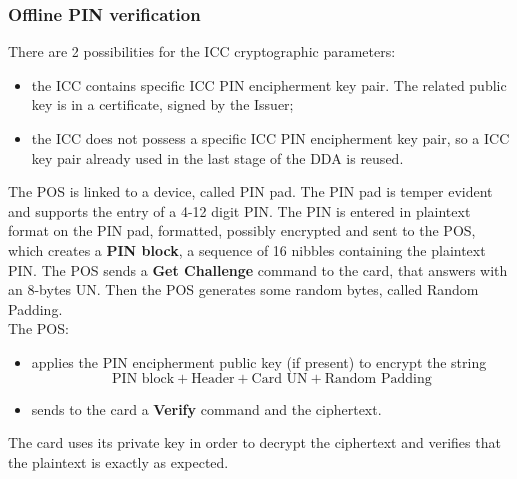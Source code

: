 \documentclass[a4paper, 10pt, titlepage]{article}
\begin{document}
\subsubsection*{Offline PIN verification}
There are 2 possibilities for the ICC cryptographic parameters:
\begin{itemize}
\item the ICC contains specific ICC PIN encipherment key pair. The related public key is in a certificate, signed by the Issuer;
\item the ICC does not possess a specific ICC PIN encipherment key pair, so a ICC key pair already used in the last stage of the DDA is reused.
\end{itemize}
The POS is linked to a device, called PIN pad. The PIN pad is temper evident and supports the entry of a 4-12 digit PIN. The PIN is entered in plaintext format on the PIN pad, formatted, possibly encrypted and sent to the POS, which creates a \textbf{PIN block}, a sequence of 16 nibbles containing the plaintext PIN.
The POS sends a \textbf{Get Challenge} command to the card, that answers with an 8-bytes UN. Then the POS generates some random bytes, called Random Padding. \\
The POS:
\begin{itemize}
\item applies the PIN encipherment public key (if present) to encrypt the string
$$\text{PIN block} + \text{Header} + \text{Card UN} + \text{Random Padding}$$
\item sends to the card a \textbf{Verify} command and the ciphertext.
\end{itemize}
The card uses its private key in order to decrypt the ciphertext and verifies that the plaintext is exactly as expected.
\end{document}
